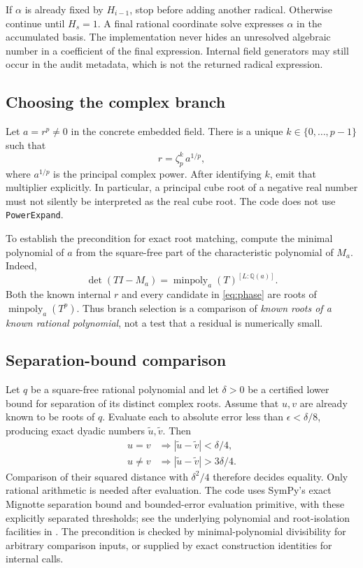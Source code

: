 \documentclass[11pt,a4paper]{article}
\theoremstyle{definition}\newtheorem{definition}[theorem]{Definition}
\theoremstyle{remark}\newtheorem{remark}[theorem]{Remark}
\newcommand{\Q}{\mathbb Q}\newcommand{\C}{\mathbb C}
\newcommand{\code}[1]{\texttt{#1}}
\begin{document}
If $\alpha$ is already fixed by $H_{i-1}$, stop before adding another
radical. Otherwise continue until $H_s=1$. A final rational coordinate solve
expresses $\alpha$ in the accumulated basis. The implementation never hides
an unresolved algebraic number in a coefficient of the final expression.
Internal field generators may still occur in the audit metadata, which is
not the returned radical expression.

\subsection{Choosing the complex branch}
Let $a=r^p\ne0$ in the concrete embedded field. There is a unique
$k\in\{0,\ldots,p-1\}$ such that
\begin{equation}\label{eq:phase}
 r=\zeta_p^k\,a^{1/p},
\end{equation}
where $a^{1/p}$ is the principal complex power. After identifying $k$, emit
that multiplier explicitly. In particular, a principal cube root of a
negative real number must not silently be interpreted as the real cube root.
The code does not use \code{PowerExpand}.

To establish the precondition for exact root matching, compute the minimal
polynomial of $a$ from the square-free part of the characteristic polynomial
of $M_a$. Indeed,
\[
 \det(TI-M_a)=\operatorname{minpoly}_a(T)^{[L:\Q(a)]}.
\]
Both the known internal $r$ and every candidate in \eqref{eq:phase} are roots
of $\operatorname{minpoly}_a(T^p)$. Thus branch selection is a comparison of
\emph{known roots of a known rational polynomial}, not a test that a residual
is numerically small.

\subsection{Separation-bound comparison}\label{sec:separation}
Let $q$ be a square-free rational polynomial and let $\delta>0$ be a
certified lower bound for separation of its distinct complex roots. Assume
that $u,v$ are already known to be roots of $q$. Evaluate each to absolute
error less than $\epsilon<\delta/8$, producing exact dyadic numbers
$\widetilde u,\widetilde v$. Then
\[
\begin{array}{ll}
 u=v &\Longrightarrow
 |\widetilde u-\widetilde v|<\delta/4,\\
 u\ne v &\Longrightarrow
 |\widetilde u-\widetilde v|>3\delta/4.
\end{array}
\]
Comparison of their squared distance with $\delta^2/4$ therefore decides
equality. Only rational arithmetic is needed after evaluation. The code uses
SymPy's exact Mignotte separation bound and bounded-error evaluation primitive,
with these explicitly separated thresholds; see the underlying polynomial
and root-isolation facilities in \cite{sympypoly}. The precondition is checked by
minimal-polynomial divisibility for arbitrary comparison inputs, or supplied
by exact construction identities for internal calls.
\end{document}
